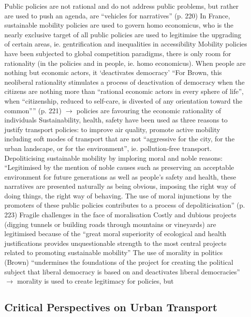 \documentclass{article}
\begin{document}
\begin{outline}
	\1 Public policies are not rational and do not address public problems, but rather are used to push an agenda, are ``vehicles for narratives'' (p. 220)
	\1 In France, sustainable mobility policies
		\2 are used to govern homo economicus, who is the nearly exclusive target of all public policies
		\2 are used to legitimise the upgrading of certain areas, ie. gentrification and inequalities in accessibility 
	\1 Mobility policies have been subjected to global competition paradigms, there is only room for rationality (in the policies and in people, ie. homo economicus). When people are nothing but economic actors, it `deactivates democracy' 
		\2 ``For Brown, this neoliberal rationality stimulates a process of deactivation of democracy when the citizens are nothing more than ``rational economic actors in every sphere of life'', when ``citizenship, reduced to self-care, is divested of any orientation toward the common'''' (p. 221)
		\2 $\rightarrow$ policies are favouring the economic rationality of individuals
	\1 Sustainability, health, safety have been used as three reasons to justify transport policies: to improve air quality, promote active mobility including soft modes of transport that are not ``aggressive for the city, for the urban landscape, or for the environment'', ie. pollution-free transport.
		\2 Depoliticising sustainable mobility by imploring moral and noble reasons: ``Legitimised by the mention of noble causes such as preserving an acceptable environment for future generations as well as people's safety and health, these narratives are presented naturally as being obvious, imposing the right way of doing things, the right way of behaving. The use of moral injunctions by the promoters of these public policies contributes to a process of depoliticisation'' (p. 223)
	\1 Fragile challenges in the face of moralisation
		\2 Costly and dubious projects (digging tunnels or building roads through mountains or vineyards) are legitimised because of the ``great moral superiority of ecological and health justifications provides unquestionable strength to the most central projects related to promoting sustainable mobility''
	\1 The use of morality in politics (Brown) ``undermines the foundations of the project for creating the political subject that liberal democracy is based on and deactivates liberal democracies'' $\rightarrow$ morality is used to create legitimacy for policies, but 
\end{outline}

\subsection{Critical Perspectives on Urban Transport}
\end{document}
